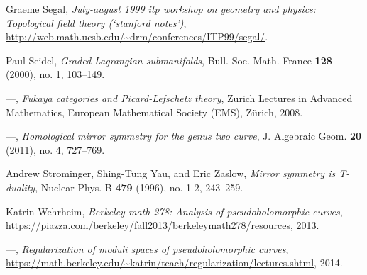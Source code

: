 \begin{description}[leftmargin=7.4em, labelwidth=6.8em, labelsep=0.6em,
                   font=\normalfont, itemsep=0.35em, parsep=0pt]
\item[{[Seg]}] Graeme Segal, \emph{July-august 1999 itp workshop on geometry and physics: Topological field theory (`stanford notes')}, \url{http://web.math.ucsb.edu/~drm/conferences/ITP99/segal/}.
\item[{[Sei00]}] Paul Seidel, \emph{Graded Lagrangian submanifolds}, Bull. Soc. Math. France \textbf{128} (2000), no. 1, 103--149.
\item[{[Sei08]}] ---, \emph{Fukaya categories and Picard-Lefschetz theory}, Zurich Lectures in Advanced Mathematics, European Mathematical Society (EMS), Z\"urich, 2008.
\item[{[Sei11]}] ---, \emph{Homological mirror symmetry for the genus two curve}, J. Algebraic Geom. \textbf{20} (2011), no. 4, 727--769.
\item[{[SYZ96]}] Andrew Strominger, Shing-Tung Yau, and Eric Zaslow, \emph{Mirror symmetry is T-duality}, Nuclear Phys. B \textbf{479} (1996), no. 1-2, 243--259.
\item[{[Weh13]}] Katrin Wehrheim, \emph{Berkeley math 278: Analysis of pseudoholomorphic curves}, \url{https://piazza.com/berkeley/fall2013/berkeleymath278/resources}, 2013.
\item[{[Weh14]}] ---, \emph{Regularization of moduli spaces of pseudoholomorphic curves}, \url{https://math.berkeley.edu/~katrin/teach/regularization/lectures.shtml}, 2014.

\end{description}
\endgroup


